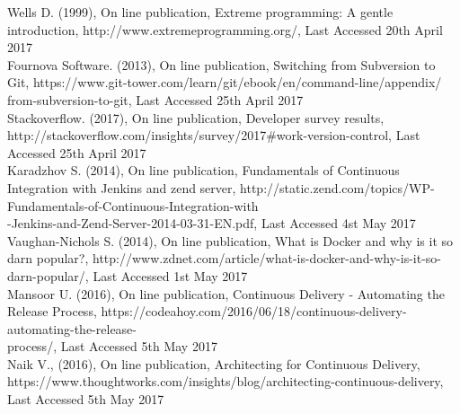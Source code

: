 \begin{thebibliography}{0}


Wells D. (1999), On line publication, Extreme programming: A gentle introduction, http://www.extremeprogramming.org/, Last Accessed 20th April 2017
\\
Fournova Software. (2013), On line publication, Switching from Subversion to Git, https://www.git-tower.com/learn/git/ebook/en/command-line/appendix/\\from-subversion-to-git, Last Accessed 25th April 2017
\\
Stackoverflow. (2017), On line publication, Developer survey results, http://stackoverflow.com/insights/survey/2017\#work-version-control, Last Accessed 25th April 2017
\\
Karadzhov S. (2014), On line publication, Fundamentals of Continuous Integration with Jenkins and zend server, http://static.zend.com/topics/WP-Fundamentals-of-Continuous-Integration-with\\
-Jenkins-and-Zend-Server-2014-03-31-EN.pdf, Last Accessed 4st May 2017
\\
Vaughan-Nichols S. (2014), On line publication, What is Docker and why is it so darn popular?, http://www.zdnet.com/article/what-is-docker-and-why-is-it-so-darn-popular/, Last Accessed 1st May 2017
\\
Mansoor U. (2016), On line publication, Continuous Delivery - Automating the Release Process, https://codeahoy.com/2016/06/18/continuous-delivery-automating-the-release-\\process/, Last Accessed 5th May 2017
\\
Naik V., (2016), On line publication, Architecting for Continuous Delivery, https://www.thoughtworks.com/insights/blog/architecting-continuous-delivery, Last Accessed 5th May 2017

\end{thebibliography}